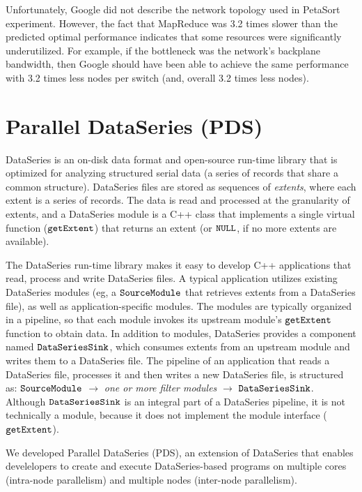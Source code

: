 \documentclass[ 11pt, letterpaper]{article}%
\begin{document}
Unfortunately, Google did not describe the network topology used in
PetaSort experiment. However, the fact
that MapReduce was 3.2 times slower than the predicted optimal performance
indicates that some resources were significantly underutilized. For example, if
the bottleneck was the network's backplane bandwidth, then Google should have
been able to achieve the same performance with 3.2 times less nodes per switch
(and, overall 3.2 times less nodes).

\section{Parallel DataSeries (PDS)}

DataSeries \cite{dataseries} is an on-disk data format and open-source run-time
library that is optimized for analyzing structured serial data (a series of
records that share a common structure). DataSeries files are stored as
sequences of \emph{extents}, where each extent is a series of records.
The data is read and processed at the granularity of extents, and a DataSeries
module is a C++ class that implements a single virtual function ($\tt
getExtent$) that returns an extent (or $\tt NULL$, if no more extents
are available).

The DataSeries run-time library makes it easy to develop C++ applications that
read, process and write DataSeries files. A typical application utilizes existing
DataSeries modules (eg, a $\tt SourceModule$ that retrieves extents from a
DataSeries file), as well as application-specific modules. The modules are
typically organized in a pipeline, so that each module invokes its upstream
module's $\tt getExtent$ function to obtain data. In addition to modules,
DataSeries provides a component named $\tt DataSeriesSink$, which consumes
extents from an upstream module and writes them to a DataSeries file. The
pipeline of an application that reads a DataSeries file, processes it and then
writes a new DataSeries file, is structured as: $\tt SourceModule$ $\to$
\emph{one or more filter modules} $\to$ $\tt DataSeriesSink$. Although $\tt DataSeriesSink$
is an integral part of a DataSeries pipeline, it is not technically a module,
because it does not implement the module interface ($\tt getExtent$).

We developed Parallel DataSeries (PDS), an extension of DataSeries that enables
develelopers to create and execute DataSeries-based programs on multiple cores
(intra-node parallelism) and multiple nodes (inter-node parallelism).
\end{document}
